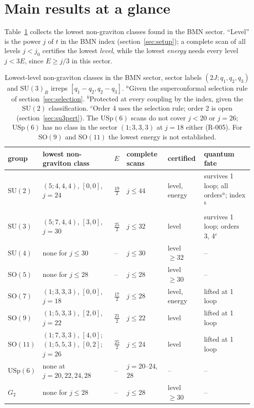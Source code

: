 \documentclass[11pt]{article}
\newcommand{\R}[1]{\textsf{R-0#1}}
\newcommand{\SU}{\mathrm{SU}}
\newcommand{\SO}{\mathrm{SO}}
\newcommand{\USp}{\mathrm{USp}}
\newcommand{\Gtwo}{G_2}
\begin{document}
\section{Main results at a glance}\label{sec:glance}

Table~\ref{tab:thresholds} collects the lowest non-graviton classes found in the BMN sector. ``Level'' is the power
$j$ of $t$ in the BMN index (section~\ref{sec:setup}); a complete scan of all levels $j<j_0$ certifies the lowest
\emph{level}, while the lowest \emph{energy} needs every level $j<3E$, since $E\ge j/3$ in this sector.

\begin{table}[h]\centering\footnotesize
\setlength{\tabcolsep}{4pt}
\begin{tabularx}{\textwidth}{@{}lllllX@{}}
\toprule
group & lowest non-graviton class & $E$ & complete scans & certified & quantum fate\\
\midrule
$\SU(2)$ & $(5;4,4,4)$, $[0,0]$, $j=24$ & $\tfrac{19}{2}$ & $j\le44$ & level, energy & survives 1 loop; all orders$^{a}$; index$^{b}$\\
$\SU(3)$ & $(5;7,4,4)$, $[3,0]$, $j=30$ & $\tfrac{25}{2}$ & $j\le32$ & level & survives 1 loop; orders 3, 4$^{c}$\\
$\SU(4)$ & none for $j\le30$ & -- & $j\le30$ & level $\ge32$ & --\\
$\SO(5)$ & none for $j\le28$ & -- & $j\le28$ & level $\ge30$ & --\\
$\SO(7)$ & $(1;3,3,3)$, $[0,0]$, $j=18$ & $\tfrac{17}{2}$ & $j\le28$ & level, energy & lifted at 1 loop\\
$\SO(9)$ & $(1;5,3,3)$, $[2,0]$, $j=22$ & $\tfrac{21}{2}$ & $j\le22$ & level & lifted at 1 loop\\
$\SO(11)$ & $(1;7,3,3)$, $[4,0]$; $(1;5,5,3)$, $[0,2]$; $j=26$ & $\tfrac{25}{2}$ & $j\le24$ & level & lifted at 1 loop\\
$\USp(6)$ & none at $j=20,22,24,28$ & -- & $j=20$--$24$, $28$ & -- & --\\
$\Gtwo$ & none for $j\le28$ & -- & $j\le28$ & level $\ge30$ & --\\
\bottomrule
\end{tabularx}
\caption{Lowest-level non-graviton classes in the BMN sector, sector labels $(2J;q_1,q_2,q_3)$ and $\SU(3)_R$ irreps
$[q_1-q_2,q_2-q_3]$. $^a$Given the superconformal selection rule of section~\ref{sec:selection}. $^b$Protected at every
coupling by the index, given the $\SU(2)$ classification. $^c$Order 4 uses the selection rule; order 2 is open
(section~\ref{sec:su3pert}). The $\USp(6)$ scans do not cover $j<20$ or $j=26$; $\USp(6)$ has no class in the sector
$(1;3,3,3)$ at $j=18$ either (\R{05}). For $\SO(9)$ and $\SO(11)$ the lowest energy is not established.}
\label{tab:thresholds}
\end{table}
\end{document}
